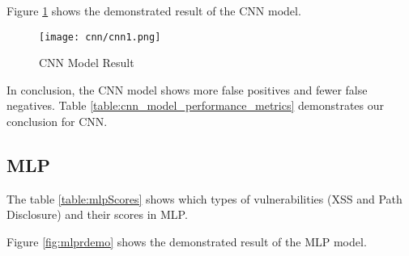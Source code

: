 Figure \ref{fig:cnnResult} shows the demonstrated result of the CNN model.

\begin{figure}[H]
 \centering
 \texttt{[image: cnn/cnn1.png]}
 \caption{CNN Model Result}
 \label{fig:cnnResult}
\end{figure}

In conclusion, the CNN model shows more false positives and fewer false negatives. Table \ref{table:cnn_model_performance_metrics} demonstrates our conclusion for CNN.

\begin{table}[H]
 \centering
 \caption{Model Performance Metrics for Vulnerability Types in CNN}
 \label{table:cnn_model_performance_metrics}
\end{table}

\subsection{MLP}
The table \ref{table:mlpScores} shows which types of vulnerabilities (XSS and Path Disclosure) and their scores in MLP.
\begin{table}[H]
 \centering
 \caption{Vulnerability Statistics and Model Performance Metrics for XSS and Path Disclosure in MLP Modal }
 \label{table:mlpScores}
\end{table}

Figure \ref{fig:mlprdemo} shows the demonstrated result of the MLP model.

